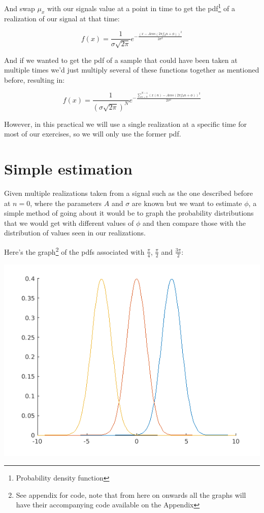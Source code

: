 \documentclass[conference,9pt]{IEEEtran}
\begin{document}
And swap $\mu_x$ with our signals value at a point in time to get the pdf\footnote{Probability density function} of a realization of our signal at that time:

$$f(x)=\frac{1}{\sigma\sqrt{2\pi}}e^{-\frac{(x-Acos(2 \pi f_d n + \phi ))^2}{2\sigma^2}}$$

And if we wanted to get the pdf of a sample that could have been taken at multiple times we'd just multiply several of these functions together as mentioned before, resulting in:

$$f(x)=\frac{1}{(\sigma\sqrt{2\pi})^N}e^{-\frac{\sum_{n=0}^{N-1}(x(n)-Acos(2 \pi f_d n + \phi ))^2}{2\sigma^2}}$$

However, in this practical we will use a single realization at a specific time for most of our exercises, so we will only use the former pdf.

\section{Simple estimation}
Given multiple realizations taken from a signal such as the one described before at $n=0$, where the parameters $A$ and $\sigma$ are known but we want to estimate $\phi$, a simple method of going about it would be to graph the probability distributions that we would get with different values of $\phi$ and then compare those with the distribution of values seen in our realizations.

Here's the graph\footnote{See appendix for code, note that from here on onwards all the graphs will have their accompanying code available on the Appendix} of the pdfs associated with $\frac{\pi}{4}$, $\frac{\pi}{2}$ and $\frac{3\pi}{2}$:

\includegraphics[scale=0.6]{3}
\end{document}
